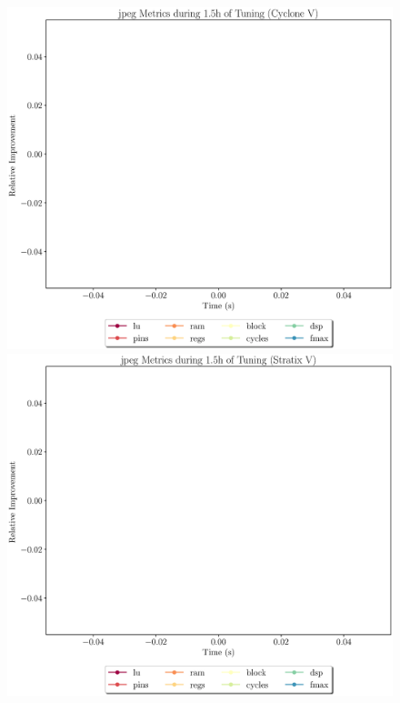 \documentclass[12pt, a4paper]{article}
\begin{document}
\newpage

\begin{figure}[htpb]
    \centering
    \begin{minipage}{.48\textwidth}
        \includegraphics[scale=.25]{jpeg_all_5400_chstone_CycloneV}
    \end{minipage}%
    \hfill
    \begin{minipage}{.48\textwidth}
        \includegraphics[scale=.25]{jpeg_all_5400_chstone_StratixV}
    \end{minipage}%


\end{figure}
\end{document}
